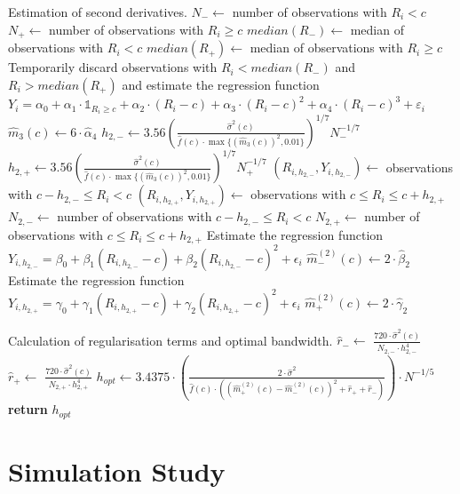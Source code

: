\documentclass[11pt, a4paper, leqno]{article}
\begin{document}
\begin{algorithm}
\begin{algorithmic}[1]
		\Steptwo Estimation of second derivatives.
		\State $N_{-} \gets$ number of observations with $R_{i} < c$
		\State $N_{+} \gets$ number of observations with $R_{i} \geq c$
		\State $median(R_{-}) \gets$ median of observations with $R_{i} < c$
		\State $median(R_{+}) \gets$ median of observations with $R_{i} \geq c$
		\State Temporarily discard observations with $R_{i} < median(R_{-})$ and $R_{i} > median(R_{+})$ and estimate the regression function $Y_{i} = \alpha_{0} + \alpha_{1} \cdot \mathds{1}_{R_{i} \geq c} + \alpha_{2} \cdot (R_{i}-c) + \alpha_{3} \cdot (R_{i}-c)^{2} + \alpha_{4} \cdot (R_{i}-c)^{3} + \varepsilon_{i}$
		\State $\widehat{m}_{3}(c) \gets 6 \cdot \widehat{\alpha}_{4}$
		\State $h_{2, -} \gets 3.56 \left( \frac{\widehat{\sigma}^{2}(c)}{\widehat{f}(c) \cdot \max\lbrace \left(\widehat{m}_{3}(c)\right)^{2}, 0.01\rbrace}\right)^{1/7} N_{-}^{-1/7}$
		\State $h_{2, +} \gets 3.56 \left( \frac{\widehat{\sigma}^{2}(c)}{\widehat{f}(c) \cdot \max\lbrace \left(\widehat{m}_{3}(c)\right)^{2}, 0.01\rbrace}\right)^{1/7} N_{+}^{-1/7}$
		\State $(R_{i, h_{2, -}}, Y_{i, h_{2, -}}) \gets$ observations with $c-h_{2, -} \leq R_{i} < c$
		\State $(R_{i, h_{2, +}}, Y_{i, h_{2, +}}) \gets$ observations with $c \leq R_{i} \leq c+h_{2, +}$
		\State $N_{2, -} \gets$ number of observations with $c-h_{2, -} \leq R_{i} < c$
		\State $N_{2, +} \gets$ number of observations with $c \leq R_{i} \leq c+h_{2, +}$
		\State Estimate the regression function  $Y_{i, h_{2,-}} = \beta_{0} + \beta_{1} (R_{i, h_{2, -}}-c) + \beta_{2} (R_{i, h_{2, -}}-c)^{2} + \epsilon_{i}$
		\State $\widehat{m}^{(2)}_{-}(c) \gets 2 \cdot \widehat{\beta}_{2}$ {\color{blue} }
		\State Estimate the regression function  $Y_{i, h_{2,+}} = \gamma_{0} + \gamma_{1} (R_{i, h_{2, +}}-c) + \gamma_{2} (R_{i, h_{2, +}}-c)^{2} + \epsilon_{i}$
		\State $\widehat{m}^{(2)}_{+}(c) \gets 2 \cdot \widehat{\gamma}_{2}$ {\color{blue} }

		\Stepthree Calculation of regularisation terms and optimal bandwidth.
		\State $\widehat{r}_{-} \gets$ $\frac{720 \cdot \widehat{\sigma}^{2}(c)}{N_{2, -} \cdot h_{2, -}^{4}}$
		\State $\widehat{r}_{+} \gets$ $\frac{720 \cdot \widehat{\sigma}^{2}(c)}{N_{2, +} \cdot h_{2, +}^{4}}$
		\State $h_{opt} \gets 3.4375 \cdot \left(\frac{2 \cdot \widehat{\sigma}^{2}}{\widehat{f}(c) \cdot \left( \left( \widehat{m}^{(2)}_{+}(c) - \widehat{m}^{(2)}_{-}(c) \right)^{2} + \widehat{r}_{+} + \widehat{r}_{-} \right)}\right) \cdot N^{-1/5}$
		\State \textbf{return} $h_{opt}$
	\end{algorithmic}
\end{algorithm}

\section{Simulation Study} %
\label{sec:sim_study}












\end{document}
